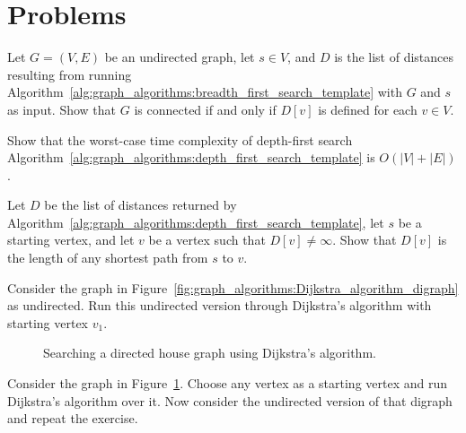 \section{Problems}

\begin{problem}
\item Let $G = (V, E)$ be an undirected graph, let $s \in V$, and $D$
  is the list of distances resulting from running
  Algorithm~\ref{alg:graph_algorithms:breadth_first_search_template}
  with $G$ and $s$ as input. Show that $G$ is connected if and only if
  $D[v]$ is defined for each $v \in V$.

\item Show that the worst-case time complexity of depth-first search
  Algorithm~\ref{alg:graph_algorithms:depth_first_search_template} is
  $O(|V| + |E|)$.

\item Let $D$ be the list of distances returned by
  Algorithm~\ref{alg:graph_algorithms:depth_first_search_template},
  let $s$ be a starting vertex, and let $v$ be a vertex such that
  $D[v] \neq \infty$. Show that $D[v]$ is the length of any shortest
  path from $s$ to $v$.

\item Consider the graph in
  Figure~\ref{fig:graph_algorithms:Dijkstra_algorithm_digraph} as
  undirected. Run this undirected version through Dijkstra's algorithm
  with starting vertex $v_1$.

\begin{figure}[!htbp]
\centering

\caption{Searching a directed house graph using Dijkstra's algorithm.}
\label{fig:graph_algorithms:Dijkstra_directed_house_graph}
\end{figure}

\item Consider the graph in
  Figure~\ref{fig:graph_algorithms:Dijkstra_directed_house_graph}. Choose
  any vertex as a starting vertex and run Dijkstra's algorithm over
  it. Now consider the undirected version of that digraph and repeat
  the exercise.


\end{problem}
